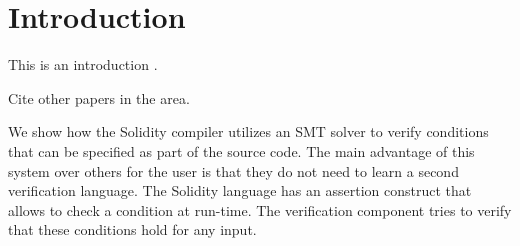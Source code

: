 \section{Introduction}

This is an introduction \cite{Bhargavan2016,Luu2016,Hirai2017}.

Cite other papers in the area.


We show how the Solidity compiler utilizes an SMT solver to verify
conditions that can be specified as part of the source code.
The main advantage of this system over others for the user is that they do not
need to learn a second verification language. The Solidity language has an
assertion construct that allows to check a condition at run-time.
The verification component tries to verify that these conditions hold for
any input.
